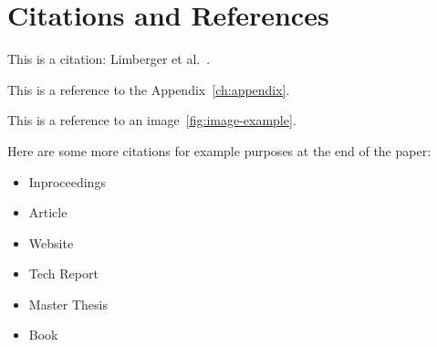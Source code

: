 \section{Citations and References}\label{sec:citations-and-references}
This is a citation: Limberger et al.~\cite{Limberger2012}.

This is a reference to the Appendix~\ref{ch:appendix}.

This is a reference to an image~\ref{fig:image-example}.

Here are some more citations for example purposes at the end of the paper:
\begin{itemize}
    \item Inproceedings~\cite{Yapo2009}
    \item Article~\cite{williams1978}
    \item Website~\cite{celestiaWebsite}
    \item Tech Report~\cite{usStandardAtmosphere}
    \item Master Thesis~\cite{fischer2018}
    \item Book~\cite{bohren1998}
\end{itemize}